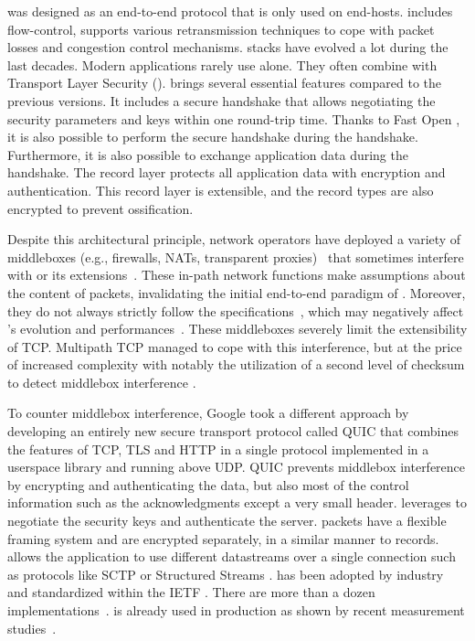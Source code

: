 

\tcp was designed as an end-to-end protocol that is only used on end-hosts.
\tcp includes flow-control, supports various retransmission techniques to cope with packet losses and congestion control mechanisms. \tcp stacks have evolved a lot during the last decades. Modern applications rarely use \tcp alone. They
often combine \tcp with Transport Layer Security (\tls). 
 \cite{rfc8446} brings several essential features compared to the previous versions. It
includes a secure handshake that allows negotiating the security parameters and
keys within one round-trip time. Thanks to \tcp Fast Open
\cite{radhakrishnan2011tcp}, it is also possible to perform the secure handshake
during the \tcp handshake. Furthermore, it is also possible to exchange
application data during the handshake. The  record layer protects all
application data with encryption and authentication. This record layer is
extensible, and the \tls record types are also encrypted to prevent
ossification.

Despite this architectural principle, network operators have deployed a variety
of middleboxes (e.g., firewalls, NATs, transparent proxies)~\cite{mCloud} that
sometimes interfere with \tcp or its extensions~\cite{medina2004measuring,
honda2011still, edeline2019bottom}. These in-path network functions make
assumptions about the content of \tcp packets, invalidating the initial
end-to-end paradigm of \tcp. Moreover, they do not always strictly follow the
\tcp specifications~\cite{honda2011still, hesmans2013tcp}, which may negatively
affect \tcp's evolution and performances~\cite{edeline2020evaluating}. These
middleboxes severely limit the extensibility of TCP. Multipath TCP \cite{rfc8684,raiciu2012hard}
managed to cope with this interference, but at the price of increased complexity
with notably the utilization of a second level of checksum to detect middlebox
interference \cite{raiciu2012hard,hesmans2013tcp}.

To counter middlebox interference, Google took a different approach by developing an
entirely new secure transport protocol called QUIC \cite{langley2017quic} that
combines the features of TCP, TLS and HTTP in a single protocol implemented
in a userspace library and running above UDP. QUIC prevents middlebox 
interference
by encrypting and authenticating the data, but also most of the control
information such as the acknowledgments except a very small header. \quic
leverages  \cite{rfc8446} to negotiate the security keys and 
authenticate
the server. \quic packets have a flexible framing system and are 
encrypted separately, in a similar manner to \tls records. \quic allows the
application to use different datastreams over a single
connection such as protocols like
SCTP \cite{rfc4960} or Structured Streams \cite{ford2007structured}.
\quic has
been adopted by industry and standardized within the IETF \cite{rfc9000}.
There are more than a dozen \quic implementations~\cite{quicimplem,marx2020same}. \quic is
already used in production as shown by recent measurement
studies~\cite{trevisan2020five}.

